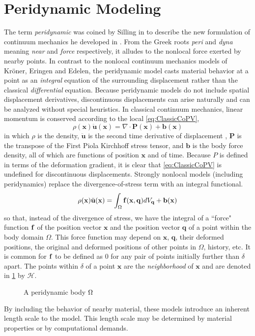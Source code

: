 \section{Peridynamic Modeling}
The term \textit{peridynamic} was coined by Silling in \cite{silling2000reformulation} to describe the new formulation of continuum mechanics he developed in \cite{silling2000reformulation}.
From the Greek roots \textit{peri} and \textit{dyna} meaning \textit{near} and \textit{force} respectively, it alludes to the nonlocal force exerted by nearby points.
In contrast to the nonlocal continuum mechanics models of Kr\"oner, Eringen and Edelen, the peridynamic model casts material behavior at a point as an \textit{integral} equation of the surrounding displacement rather than the classical \textit{differential} equation.
Because peridynamic models do not include spatial displacement derivatives, discontinuous displacements can arise naturally and can be analyzed without special heuristics. 
In classical continuum mechanics, linear momentum is conserved according to the local  \cref{eq:ClassicCoPV},
%
\begin{equation}
\label{eq:ClassicCoPV}
\rho(\mathbf{x})\ddot{\mathbf{u}}(\mathbf{x}) = \nabla \cdot \mathbf{P}(\mathbf{x}) + \mathbf{b}(\mathbf{x})
\end{equation}
%
in which $\rho$ is the density, $\ddot{\mathbf{u}}$ is the second time derivative of displacement , $\mathbf{P}$ is the transpose of the First Piola Kirchhoff stress tensor, and $\mathbf{b}$ is the body force density, all of which are functions of position $\mathbf{x}$ and of time. 
Because \(P\) is defined in terms of the deformation gradient, it is clear that \cref{eq:ClassicCoPV} is undefined for discontinuous displacements. 
Strongly nonlocal models (including peridynamics) replace the divergence-of-stress term with an integral functional.
%
\begin{equation}
\label{eq:PDCoPV}
\rho(\mathbf{x})\ddot{\mathbf{u}}(\mathbf{x}) = \int_\Omega \mathit{\mathbf{f}}(\mathbf{x},\mathbf{q}) dV_\mathbf{q}  + \mathbf{b}(\mathbf{x})
\end{equation}
%
so that, instead of the divergence of stress, we have the integral of a ``force" function $\mathit{\mathbf{f}}$ of the position vector $\mathbf{x}$ and the position vector $\mathbf{q}$ of a point within the body domain $\Omega$. 
This force function may depend on \(\mathbf{x}\), \(\mathbf{q}\), their deformed positions, the original and deformed positions of other points in \(\Omega\), history, etc.
It is common for \(\mathit{\mathbf{f}}\) to be defined as \(0\) for any pair of points initially further than \(\delta\) apart. 
The points within \(\delta\) of a point \(\mathbf{x}\) are the \textit{neighborhood} of \(\mathbf{x}\) and are denoted in \cref{fig:PDbody} by \(\mathcal{H}\).
%
\begin{figure}[h]
  \centering
{}
\caption{A peridynamic body \protect\(\Omega\protect\)}
\label{fig:PDbody}
\end{figure}
% 
By including the behavior of nearby material, these models introduce an inherent length scale to the model. 
This length scale may be determined by material properties or by computational demands.

